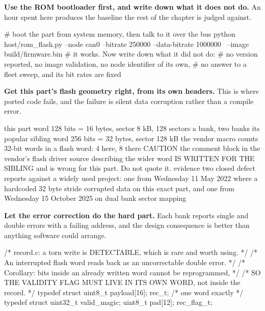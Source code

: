 \begin{steps}
\item \textbf{Use the ROM bootloader first, and write down what it does not
do.} An hour spent here produces the baseline the rest of the chapter is judged
against.
\begin{shellcode}
# boot the part from system memory, then talk to it over the bus
python host/rom_flash.py --node can0 --bitrate 250000 --data-bitrate 1000000 \
       --image build/firmware.bin
# it works. Now write down what it did not do:
#   no version reported, no image validation, no node identifier of its own,
#   no answer to a fleet sweep, and its bit rates are fixed
\end{shellcode}

\item \textbf{Get this part's flash geometry right, from its own headers.} This
is where ported code fails, and the failure is silent data corruption rather
than a compile error.
\begin{plaincode}
this part            word 128 bits = 16 bytes, sector 8 kB,
                     128 sectors a bank, two banks
its popular sibling  word 256 bits = 32 bytes, sector 128 kB
the vendor macro     counts 32-bit words in a flash word: 4 here, 8 there
CAUTION              the comment block in the vendor's flash driver source
                     describing the wider word IS WRITTEN FOR THE SIBLING
                     and is wrong for this part. Do not quote it.
evidence             two closed defect reports against a widely used project:
                     one from Wednesday 11 May 2022 where a hardcoded 32 byte
                     stride corrupted data on this exact part, and one from
                     Wednesday 15 October 2025 on dual bank sector mapping
\end{plaincode}

\item \textbf{Let the error correction do the hard part.} Each bank reports
single and double errors with a failing address, and the design consequence is
better than anything software could arrange.
\begin{ccode}
/* record.c: a torn write is DETECTABLE, which is rare and worth using. */
/* An interrupted flash word reads back as an uncorrectable double error.   */
/* Corollary: bits inside an already written word cannot be reprogrammed,   */
/* SO THE VALIDITY FLAG MUST LIVE IN ITS OWN WORD, not inside the record.   */
typedef struct { uint8_t payload[16]; } rec_t;       /* one word exactly */
typedef struct { uint32_t valid_magic; uint8_t pad[12]; } rec_flag_t;
\end{ccode}


\end{steps}
